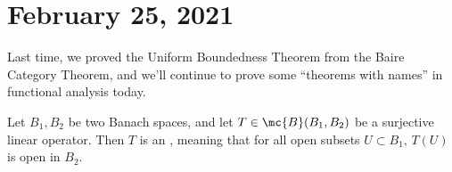 
\pagebreak\section*{February 25, 2021}

Last time, we proved the Uniform Boundedness Theorem from the Baire Category Theorem, and we'll continue to prove some ``theorems with names'' in functional analysis today.

\begin{theorem}
Let $B_1, B_2$ be two Banach spaces, and let $T \in \mc{B}(B_1, B_2)$ be a surjective linear operator. Then $T$ is an , meaning that for all open subsets $U \subset B_1$, $T(U)$ is open in $B_2$.
\end{theorem}
